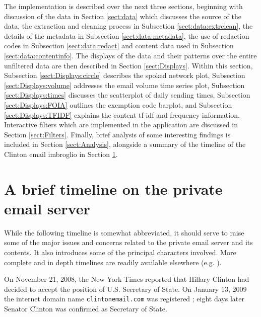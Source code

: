 \documentclass[journal]{vgtc}                %
\begin{document}
The implementation is described over the next three sections, beginning with discussion of the data in Section \ref{sect:data} which discusses the source of the data, the extraction and cleaning process in Subsection \ref{sect:data:extrclean}, the details of the metadata in Subsection \ref{sect:data:metadata}, the use of redaction codes in Subsection \ref{sect:data:redact} and content data used in Subsection \ref{sect:data:contentinfo}. The displays of the data and their patterns over the entire unfiltered data are then described in Section \ref{sect:Displays}. Within this section, Subsection \ref{sect:Displays:circle} describes the spoked network plot, Subsection \ref{sect:Displays:volume} addresses the email volume time series plot, Subsection \ref{sect:Displays:times} discusses the scatterplot of daily sending times, Subsection \ref{sect:Displays:FOIA} outlines the exemption code barplot, and Subsection \ref{sect:Displays:TFIDF} explains the content tf-idf and frequency information. Interactive filters which are implemented in the application are discussed in Section \ref{sect:Filters}. Finally, brief analysis of some interesting findings is included in Section \ref{sect:Analysis}, alongside a summary of the timeline of the Clinton email imbroglio in Section \ref{sect:Timeline}.

%
\section{A brief timeline on the private email server}
\label{sect:Timeline}
While the following timeline is somewhat abbreviated, it should serve to raise some of the major issues and concerns related to the private email server and its contents.  It also introduces some of the principal characters involved.  More complete and in depth timelines are readily available elsewhere (e.g. \cite{attkissonTimeline, thompsonTimeline, WashPostTimeline, clintonWikipedia, TimeMagEverything}).

On November 21, 2008, the New York Times reported that Hillary Clinton had decided to accept the position of U.S. Secretary of State.  On January 13, 2009 the internet domain name \texttt{clintonemail.com} was registered \cite{whoisClintonserver}; eight days later Senator Clinton was confirmed as Secretary of State.  
\end{document}
